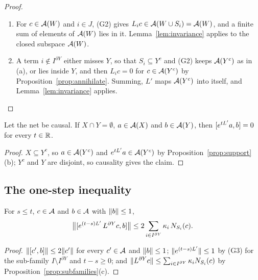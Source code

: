 \begin{proof}
\begin{enumerate}[label=(\alph*),nosep]
\item For $c\in\mathcal A(W)$ and $i\in J$, (G2) gives $L_ic\in\mathcal A(W\cup S_i)=\mathcal A(W)$, and a finite sum of
elements of $\mathcal A(W)$ lies in it. Lemma~\ref{lem:invariance} applies to the closed subspace
$\mathcal A(W)$.
\item A term $i\notin I^{\partial Y}$ either misses $Y$, so that $S_i\subseteq Y^c$ and
(G2) keeps $\mathcal A(Y^c)$ as in (a), or lies inside $Y$, and then $L_ic=0$ for $c\in\mathcal A(Y^c)$ by
Proposition~\ref{prop:annihilate}. Summing, $L'$ maps $\mathcal A(Y^c)$ into itself, and
Lemma~\ref{lem:invariance} applies.\qedhere
\end{enumerate}
\end{proof}

\begin{proposition}\label{prop:first}
Let the net be causal. If $X\cap Y=\emptyset$, $a\in\mathcal A(X)$ and $b\in\mathcal A(Y)$, then
$[e^{tL'}a,b]=0$ for every $t\in\mathbb R$.
\end{proposition}

\begin{proof}
$X\subseteq Y^c$, so $a\in\mathcal A(Y^c)$ and $e^{tL'}a\in\mathcal A(Y^c)$ by
Proposition~\ref{prop:support}(b); $Y^c$ and $Y$ are disjoint, so causality gives the claim.
\end{proof}

\subsection{The one-step inequality}\label{subsec:onestep}

\begin{proposition}\label{prop:reset}
For $s\le t$, $c\in\mathcal A$ and $b\in\mathcal A$ with $\lVert b\rVert\le1$,
\[
  \bigl\lVert[e^{(t-s)L'}\,L^{\partial Y}c,b]\bigr\rVert\le2\sum_{i\in I^{\partial Y}}\kappa_i\,N_{S_i}(c).
\]
\end{proposition}

\begin{proof}
$\lVert [c',b]\rVert\le2\lVert c'\rVert$ for every $c'\in\mathcal A$ and $\lVert b\rVert\le1$; $\lVert e^{(t-s)L'}\rVert\le1$
by (G3) for the sub-family $I\setminus I^{\partial Y}$ and $t-s\ge0$; and
$\lVert L^{\partial Y}c\rVert\le\sum_{i\in I^{\partial Y}}\kappa_iN_{S_i}(c)$ by
Proposition~\ref{prop:subfamilies}(c).
\end{proof}

\begin{figure}[t]
\centering

\caption{}
\label{fig:recursion}
\end{figure}

